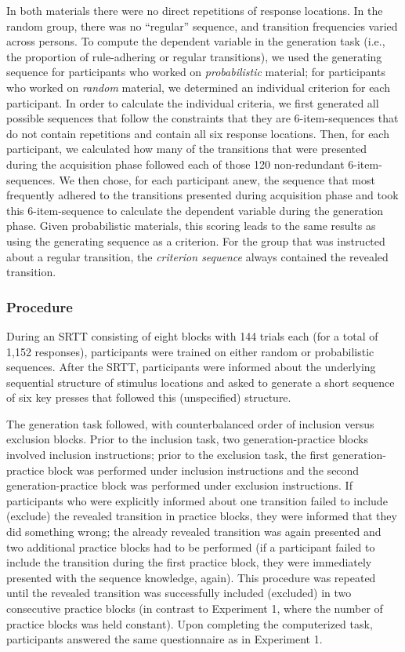 \documentclass[floatsintext,doc]{apa6}
\theoremstyle{definition}
\theoremstyle{definition}
\theoremstyle{definition}
\theoremstyle{remark}
\begin{document}
In both materials there were no direct repetitions of response
locations. In the random group, there was no \enquote{regular} sequence,
and transition frequencies varied across persons. To compute the
dependent variable in the generation task (i.e., the proportion of
rule-adhering or regular transitions), we used the generating sequence
for participants who worked on \emph{probabilistic} material; for
participants who worked on \emph{random} material, we determined an
individual criterion for each participant. In order to calculate the
individual criteria, we first generated all possible sequences that
follow the constraints that they are 6-item-sequences that do not
contain repetitions and contain all six response locations. Then, for
each participant, we calculated how many of the transitions that were
presented during the acquisition phase followed each of those 120
non-redundant 6-item-sequences. We then chose, for each participant
anew, the sequence that most frequently adhered to the transitions
presented during acquisition phase and took this 6-item-sequence to
calculate the dependent variable during the generation phase. Given
probabilistic materials, this scoring leads to the same results as using
the generating sequence as a criterion. For the group that was
instructed about a regular transition, the \emph{criterion sequence}
always contained the revealed transition.

\subsubsection{Procedure}\label{procedure-1}

During an SRTT consisting of eight blocks with 144 trials each (for a
total of 1,152 responses), participants were trained on either random or
probabilistic sequences. After the SRTT, participants were informed
about the underlying sequential structure of stimulus locations and
asked to generate a short sequence of six key presses that followed this
(unspecified) structure.

The generation task followed, with counterbalanced order of inclusion
versus exclusion blocks. Prior to the inclusion task, two
generation-practice blocks involved inclusion instructions; prior to the
exclusion task, the first generation-practice block was performed under
inclusion instructions and the second generation-practice block was
performed under exclusion instructions. If participants who were
explicitly informed about one transition failed to include (exclude) the
revealed transition in practice blocks, they were informed that they did
something wrong; the already revealed transition was again presented and
two additional practice blocks had to be performed (if a participant
failed to include the transition during the first practice block, they
were immediately presented with the sequence knowledge, again). This
procedure was repeated until the revealed transition was successfully
included (excluded) in two consecutive practice blocks (in contrast to
Experiment 1, where the number of practice blocks was held constant).
Upon completing the computerized task, participants answered the same
questionnaire as in Experiment 1.
\end{document}
